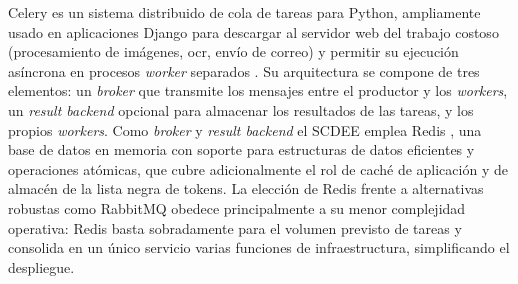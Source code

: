 Celery es un sistema distribuido de cola de tareas para Python,
ampliamente usado en aplicaciones Django para descargar al servidor web
del trabajo costoso (procesamiento de imágenes, \acs{ocr}, envío de
correo) y permitir su ejecución asíncrona en procesos \textit{worker}
separados \cite{celery}. Su arquitectura se compone de tres elementos:
un \textit{broker} que transmite los mensajes entre el productor y los
\textit{workers}, un \textit{result backend} opcional para almacenar los
resultados de las tareas, y los propios \textit{workers}. Como
\textit{broker} y \textit{result backend} el SCDEE emplea Redis
\cite{redis}, una base de datos en memoria con soporte para estructuras
de datos eficientes y operaciones atómicas, que cubre adicionalmente el
rol de caché de aplicación y de almacén de la lista negra de tokens. La
elección de Redis frente a alternativas robustas como RabbitMQ obedece
principalmente a su menor complejidad operativa: Redis basta sobradamente
para el volumen previsto de tareas y consolida en un único servicio
varias funciones de infraestructura, simplificando el despliegue.
